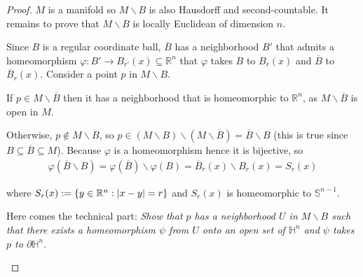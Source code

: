 \begin{proof}
	$M$ is a manifold so $M\smallsetminus B$ is also Hausdorff and second-countable. It remains to prove that $M\smallsetminus B$ is locally Euclidean of dimension $n$.

	Since $B$ is a regular coordinate ball, $\overline{B}$ has a neighborhood $B'$ that admits a homeomorphism $\varphi: B' \to B_{r'}(x) \subseteq \mathbb{R}^{n}$ that $\varphi$ takes $B$ to $B_{r}(x)$ and $\overline{B}$ to $\overline{B}_{r}(x)$. Consider a point $p$ in $M\smallsetminus B$.

	If $p \in M\smallsetminus \overline{B}$ then it has a neighborhood that is homeomorphic to $\mathbb{R}^{n}$, as $M\smallsetminus \overline{B}$ is open in $M$.

	Otherwise, $p \notin M\smallsetminus \overline{B}$, so $p \in (M\smallsetminus B) \smallsetminus (M\smallsetminus \overline{B}) = \overline{B} \smallsetminus B$ (this is true since $B \subseteq \overline{B} \subseteq M$). Because $\varphi$ is a homeomorphism hence it is bijective, so
	\begin{align*}
		\varphi(\overline{B}\smallsetminus B) = \varphi(\overline{B}) \smallsetminus \varphi(B) = \overline{B}_{r}(x)\smallsetminus B_{r}(x) = S_{r}(x)
	\end{align*}

	where $S_{r}(x) := \left\{{ y \in \mathbb{R}^{n} : \left\vert{x - y}\right\vert = r }\right\}$ and $S_{r}(x)$ is homeomorphic to $\mathbb{S}^{n-1}$.

	Here comes the technical part: \textit{Show that $p$ has a neighborhood $U$ in $M\smallsetminus B$ such that there exists a homeomorphism $\psi$ from $U$ onto an open set of $\mathbb{H}^{n}$ and $\psi$ takes $p$ to $\partial\mathbb{H}^{n}$.}
	\begin{figure}[htp]
		\centering
\end{figure}
\end{proof}
